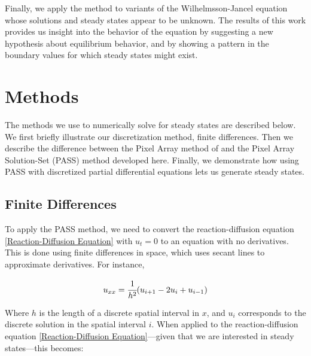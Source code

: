 \documentclass[11pt]{article}
\begin{document}
Finally, we apply the method to variants of the Wilhelmsson-Jancel equation whose solutions and steady states appear to be unknown. The results of this work provides us insight into the behavior of the equation by suggesting a new hypothesis about equilibrium behavior, and by showing a pattern in the boundary values for which steady states might exist.

\section{Methods}\label{sec:methods}

The methods we use to numerically solve for steady states are described below. We first briefly illustrate our discretization method, finite differences. Then we describe the difference between the Pixel Array method of \citep{Introduction_to_PA} and the Pixel Array Solution-Set (PASS) method developed here. Finally, we demonstrate how using PASS with discretized partial differential equations lets us generate steady states.

\subsection{Finite Differences}

\begin{comment}
Introduce set theoretic variant of pixel array method. Uses (blank) as addition, (blank) as multiplication, gives full solutions instead of merely indicating the presence of a solution. Use the homogeneous heat equation as an example.
\end{comment}

To apply the PASS method, we need to convert the reaction-diffusion equation \eqref{Reaction-Diffusion Equation} with $u_t = 0$ to an equation with no derivatives. This is done using finite differences in space, which uses secant lines to approximate derivatives. For instance,

\begin{equation}
    \label{FD second order}
    u_{xx} = \cfrac{1}{h^2} (u_{i+1} - 2u_i + u_{i-1})
\end{equation}

\noindent Where $h$ is the length of a discrete spatial interval in $x$, and $u_i$ corresponds to the discrete solution in the spatial interval $i$. When applied to the reaction-diffusion equation \eqref{Reaction-Diffusion Equation}---given that we are interested in steady states---this becomes:
\end{document}

